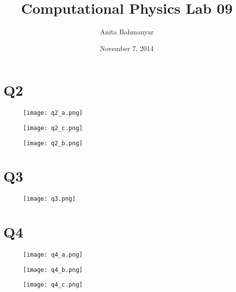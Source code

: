 \documentclass[letterpaper,12pt]{article}
\title{Computational Physics Lab 09}
\author{Anita Bahmanyar}
\affil{\small {Student Number: 998909098}}
\date{November 7, 2014}
\begin{document}
\maketitle

\section*{Q2}

\FloatBarrier
\begin{figure}[H]
\centering
\texttt{[image: q2\_a.png]}
\caption{}
\end{figure}
\FloatBarrier

\FloatBarrier
\begin{figure}[H]
\centering
\texttt{[image: q2\_c.png]}
\caption{}
\end{figure}
\FloatBarrier

\FloatBarrier
\begin{figure}[H]
\centering
\texttt{[image: q2\_b.png]}
\caption{}
\end{figure}
\FloatBarrier


\section*{Q3}

\FloatBarrier
\begin{figure}[H]
\centering
\texttt{[image: q3.png]}
\caption{}
\end{figure}
\FloatBarrier


\section*{Q4}

\FloatBarrier
\begin{figure}[H]
\centering
\texttt{[image: q4\_a.png]}
\caption{}
\end{figure}
\FloatBarrier

\FloatBarrier
\begin{figure}[H]
\centering
\texttt{[image: q4\_b.png]}
\caption{}
\end{figure}
\FloatBarrier

\FloatBarrier
\begin{figure}[H]
\centering
\texttt{[image: q4\_c.png]}
\caption{}
\end{figure}
\FloatBarrier
\end{document}
